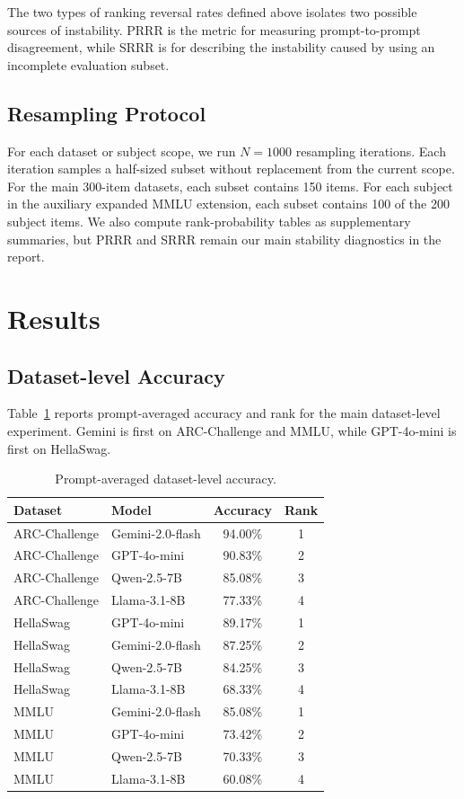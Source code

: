 \documentclass[11pt]{article}
\theoremstyle{definition}
\begin{document}
The two types of ranking reversal rates defined above isolates two possible sources of instability. PRRR is the metric for measuring prompt-to-prompt disagreement, while SRRR is for describing the instability caused by using an incomplete evaluation subset.

\subsection{Resampling Protocol}

For each dataset or subject scope, we run $N=1000$ resampling iterations. Each iteration samples a half-sized subset without replacement from the current scope. For the main 300-item datasets, each subset contains 150 items. For each subject in the auxiliary expanded MMLU extension, each subset contains 100 of the 200 subject items. We also compute rank-probability tables as supplementary summaries, but PRRR and SRRR remain our main stability diagnostics in the report.

\section{Results}\label{section5Results}

\subsection{Dataset-level Accuracy}

Table~\ref{tab:acc} reports prompt-averaged accuracy and rank for the main dataset-level experiment. Gemini is first on ARC-Challenge and MMLU, while GPT-4o-mini is first on HellaSwag.

\begin{table}[H]
\centering
\caption{Prompt-averaged dataset-level accuracy.}
\label{tab:acc}
\begin{tabular}{@{}llcc@{}}
\toprule
\textbf{Dataset} & \textbf{Model} & \textbf{Accuracy} & \textbf{Rank} \\
\midrule
ARC-Challenge & Gemini-2.0-flash & 94.00\% & 1 \\
ARC-Challenge & GPT-4o-mini & 90.83\% & 2 \\
ARC-Challenge & Qwen-2.5-7B & 85.08\% & 3 \\
ARC-Challenge & Llama-3.1-8B & 77.33\% & 4 \\
\midrule
HellaSwag & GPT-4o-mini & 89.17\% & 1 \\
HellaSwag & Gemini-2.0-flash & 87.25\% & 2 \\
HellaSwag & Qwen-2.5-7B & 84.25\% & 3 \\
HellaSwag & Llama-3.1-8B & 68.33\% & 4 \\
\midrule
MMLU & Gemini-2.0-flash & 85.08\% & 1 \\
MMLU & GPT-4o-mini & 73.42\% & 2 \\
MMLU & Qwen-2.5-7B & 70.33\% & 3 \\
MMLU & Llama-3.1-8B & 60.08\% & 4 \\
\bottomrule
\end{tabular}
\end{table}
\end{document}

